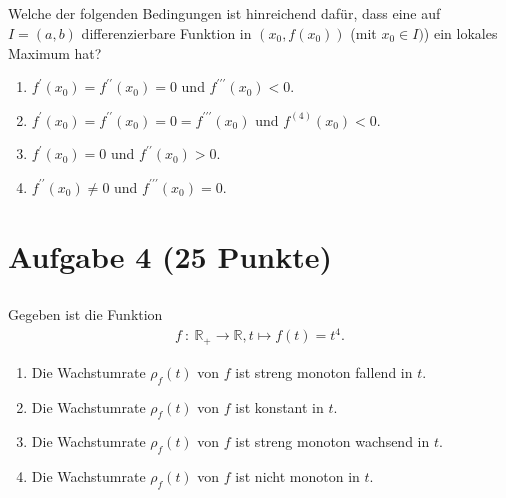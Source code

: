 \subsection*{}
Welche der folgenden Bedingungen ist hinreichend dafür, dass eine auf $I=(a,b)$ differenzierbare Funktion in
$(x_0,f(x_0))$ (mit $x_0 \in I)$) ein lokales Maximum hat?
\renewcommand{\labelenumi}{(\alph{enumi})}
\begin{enumerate}
\item $f^\prime(x_0) = f^{\prime \prime}(x_0) = 0$ und $f^{\prime \prime \prime}(x_0) < 0$.
\item $f^\prime(x_0) = f^{\prime \prime}(x_0) = 0 = f^{\prime \prime \prime}(x_0) $ und $f^{(4)}(x_0)<0$.
\item $f^\prime(x_0)=0$ und $f^{\prime \prime}(x_0) >0$.
\item $f^{\prime \prime}(x_0) \neq 0$ und $f^{\prime \prime \prime}(x_0)=0$.
\end{enumerate}
\newpage

\section*{Aufgabe 4 (25 Punkte)}
\vspace{0.4cm}
\subsection*{}
Gegeben ist die Funktion 
\begin{align*}
f \ : \ \mathbb{R}_+ \to \mathbb{R},
t \mapsto f(t) = t^4.
\end{align*}
\renewcommand{\labelenumi}{(\alph{enumi})}
\begin{enumerate}
\item Die Wachstumrate $\rho_f(t)$ von $f$ ist streng monoton fallend in $t$.
\item Die Wachstumrate $\rho_f(t)$ von $f$ ist konstant in $t$.
\item Die Wachstumrate $\rho_f(t)$ von $f$ ist streng monoton wachsend in $t$.
\item Die Wachstumrate $\rho_f(t)$ von $f$ ist nicht monoton in $t$.
\end{enumerate}
\ \\
\\
